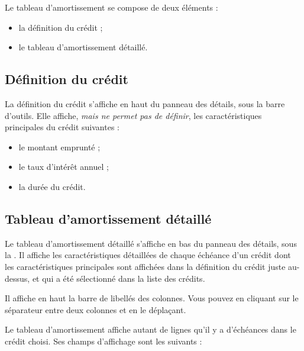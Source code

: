 Le tableau d'amortissement se compose de deux éléments :
\begin{itemize}
	 \item la définition du crédit ; 
	 \item le tableau d'amortissement détaillé.
\end{itemize}


\subsection{Définition du crédit\label{credit-amortization-definition}}

La définition du crédit s'affiche en haut du panneau des détails, sous la barre d'outils. Elle affiche, \emph{mais ne permet pas de définir}, les caractéristiques principales du crédit suivantes :

\begin{itemize}
	 \item le montant emprunté ; 
	 \item le taux d'intérêt annuel ;
	 \item la durée du crédit.
\end{itemize}


\subsection{Tableau d'amortissement détaillé\label{credit-amortization-details}}

Le tableau d'amortissement détaillé s'affiche en bas du panneau des détails, sous la . Il affiche les caractéristiques détaillées de chaque échéance d'un crédit dont les caractéristiques principales sont affichées dans la définition du crédit juste au-dessus, et qui a été sélectionné dans la liste des crédits. 

Il affiche en haut la barre de libellés des colonnes. Vous pouvez  en cliquant sur le séparateur entre deux colonnes et en le déplaçant. 


Le tableau d'amortissement affiche autant de lignes qu'il y a d'échéances dans le crédit choisi. Ses champs d'affichage sont les suivants :

